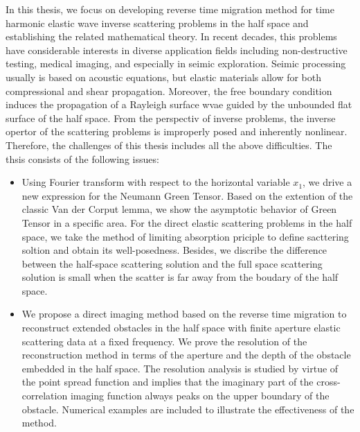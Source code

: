 In this thesis, we focus on developing reverse time migration method for time harmonic elastic wave inverse scattering problems in the half space and establishing the related mathematical theory. In recent decades, this problems have considerable interests in diverse application fields including non-destructive testing, medical imaging, and especially in seimic exploration.
Seimic processing
 usually is based on acoustic equations, but elastic materials allow for both compressional and shear propagation. Moreover, the free boundary condition induces the propagation of a Rayleigh surface wvae guided by the unbounded flat surface of the half space. From the perspectiv of inverse problems, the inverse opertor of the scattering problems is improperly posed and inherently nonlinear. Therefore, the challenges of this thesis includes all the above difficulties. The thsis consists of the following issues:
\begin{itemize}
	\item Using Fourier transform with respect to the horizontal variable $x_1$, we drive a new expression for the Neumann Green Tensor. Based on the extention of the classic Van der Corput lemma, we show the asymptotic behavior of Green Tensor in a specific area. For the direct elastic scattering problems in the half space, we take the method of limiting absorption priciple to define  sacttering soltion and obtain its well-posedness. Besides, we discribe the difference between the half-space scattering solution and the full space scattering solution is small when the scatter is far away from the boudary of the half space.
	
	
	\item We propose a direct imaging method based on the reverse time migration to reconstruct extended
	obstacles in the half space with finite aperture elastic scattering data at a fixed
	frequency. We prove the resolution of the reconstruction method in terms of the
	aperture and the depth of the obstacle embedded in the half space. The resolution
	analysis is studied by virtue of the point spread function and implies that the imaginary 
	part of the cross-correlation imaging function
	always peaks on the upper boundary of the obstacle. Numerical examples
	are included to illustrate the effectiveness of the method. 
\end{itemize}
	


